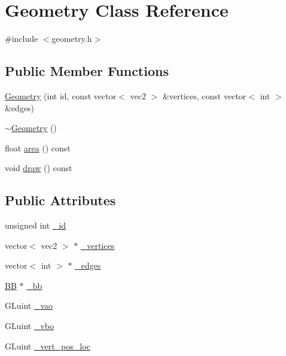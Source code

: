 \hypertarget{class_geometry}{\section{Geometry Class Reference}
\label{class_geometry}
}


{\ttfamily \#include $<$geometry.\+h$>$}

\subsection*{Public Member Functions}
\begin{DoxyCompactItemize}
\item 
\hyperlink{class_geometry_a75dcc4432a7296189d625717b808c451}{Geometry} (int id, const vector$<$ vec2 $>$ \&vertices, const vector$<$ int $>$ \&edges)
\item 
\hyperlink{class_geometry_ad55e832122ab3a2833dcaa6507867678}{$\sim$\+Geometry} ()
\item 
float \hyperlink{class_geometry_a41f3f2954a86d1f2e09bdd59b4c6d62e}{area} () const 
\item 
void \hyperlink{class_geometry_aeabdd331b6654e60cd3502b334719531}{draw} () const 
\end{DoxyCompactItemize}
\subsection*{Public Attributes}
\begin{DoxyCompactItemize}
\item 
unsigned int \hyperlink{class_geometry_afdd3cb26908cc8cd257caeb1af9376ef}{\+\_\+id}
\item 
vector$<$ vec2 $>$ $\ast$ \hyperlink{class_geometry_a6bba14459d18ceb7000fe8e36c96b509}{\+\_\+vertices}
\item 
vector$<$ int $>$ $\ast$ \hyperlink{class_geometry_af7d427b2dd365204c7d8cd8d94b20a80}{\+\_\+edges}
\item 
\hyperlink{class_b_b}{B\+B} $\ast$ \hyperlink{class_geometry_a6b3ca6d44997ee99d548a19bc39e0c72}{\+\_\+bb}
\item 
G\+Luint \hyperlink{class_geometry_ae8c3a8b756c681aa95bf7e0998f0a37d}{\+\_\+vao}
\item 
G\+Luint \hyperlink{class_geometry_a66c15fff8a8a614e5f9734974354fd2e}{\+\_\+vbo}
\item 
G\+Luint \hyperlink{class_geometry_a547d84fcd9258557891da46d19985544}{\+\_\+vert\+\_\+pos\+\_\+loc}
\end{DoxyCompactItemize}


